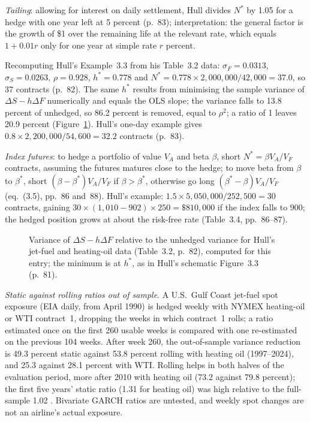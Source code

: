 \begin{qfmodel}
\emph{Tailing}: allowing for interest on daily settlement, Hull divides $N^*$ by 1.05 for a hedge with one year left at 5 percent (p.~83); interpretation: the general factor is the growth of \$1 over the remaining life at the relevant rate, which equals $1+0.01r$ only for one year at simple rate $r$ percent.

 Recomputing Hull's Example~3.3 from his Table~3.2 data: $\sigma_F=0.0313$, $\sigma_S=0.0263$, $\rho=0.928$, $h^*=0.778$ and $N^*=0.778\times2{,}000{,}000/42{,}000=37.0$, so 37 contracts (p.~82). The same $h^*$ results from minimising the sample variance of $\Delta S-h\Delta F$ numerically and equals the OLS slope; the variance falls to 13.8 percent of unhedged, so 86.2 percent is removed, equal to $\rho^2$; a ratio of 1 leaves 20.9 percent (Figure~\ref{fig:hedge-variance}). Hull's one-day example gives $0.8\times2{,}200{,}000/54{,}600=32.2$ contracts (p.~83).

\emph{Index futures}: to hedge a portfolio of value $V_A$ and beta $\beta$, short $N^*=\beta V_A/V_F$ contracts, assuming the futures matures close to the hedge; to move beta from $\beta$ to $\beta^*$, short $(\beta-\beta^*)V_A/V_F$ if $\beta>\beta^*$, otherwise go long $(\beta^*-\beta)V_A/V_F$ (eq.~(3.5), pp.~86 and~88). Hull's example: $1.5\times5{,}050{,}000/252{,}500=30$ contracts, gaining $30\times(1{,}010-902)\times250=\$810{,}000$ if the index falls to 900; the hedged position grows at about the risk-free rate (Table~3.4, pp.~86--87).
\begin{figure}[ht]
\centering

\caption{Variance of $\Delta S-h\Delta F$ relative to the unhedged variance for Hull's jet-fuel and heating-oil data (Table~3.2, p.~82), computed for this entry; the minimum is at $h^*$, as in Hull's schematic Figure~3.3 (p.~81).}\label{fig:hedge-variance}
\end{figure}

\emph{Static against rolling ratios out of sample}. A U.S.\ Gulf Coast jet-fuel spot exposure (EIA daily, from April 1990) is hedged weekly with NYMEX heating-oil or WTI contract~1, dropping the weeks in which contract~1 rolls; a ratio estimated once on the first 260 usable weeks is compared with one re-estimated on the previous 104 weeks. After week 260, the out-of-sample variance reduction is 49.3 percent static against 53.8 percent rolling with heating oil (1997--2024), and 25.3 against 28.1 percent with WTI. Rolling helps in both halves of the evaluation period, more after 2010 with heating oil (73.2 against 79.8 percent); the first five years' static ratio (1.31 for heating oil) was high relative to the full-sample 1.02 \citep[spot series EER\_EPJK\_PF4\_RGC\_DPG]{eia-jet-fuel-spot}. Bivariate GARCH ratios are untested, and weekly spot changes are not an airline's actual exposure.


\end{qfmodel}
